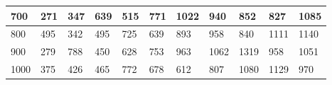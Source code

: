 \documentclass[10pt,letterpaper]{article}
\begin{document}
\begin{center}
\begin{table}
\begin{tabular} { |m{0.5cm}|m{1.3cm}|m{1.3cm}|m{1.3cm}|m{1.3cm}|m{1.3cm}|m{1.3cm}|m{1.3cm}|m{1.3cm}|m{1.3cm}|m{1.3cm}|}
\hline
\cellcolor{Gray}700 & \Large 271 & \Large 347 & \Large 639 & \Large 515 & \Large 771 & \Large 1022 & \Large 940 & \Large 852 & \Large 827 & \Large 1085 \\
\hline
\cellcolor{Gray}800 & \Large 495 & \Large 342 & \Large 495 & \Large 725 & \Large 639 & \Large 893 & \Large 958 & \Large 840 & \Large 1111 & \Large 1140 \\
\hline
\cellcolor{Gray}900 & \Large 279 & \Large 788 & \Large 450 & \Large 628 & \Large 753 & \Large 963 & \Large 1062 & \Large 1319 & \Large 958 & \Large 1051 \\
\hline
\cellcolor{Gray}1000 & \Large 375 & \Large 426 & \Large 465 & \Large 772 & \Large 678 & \Large 612 & \Large 807 & \Large 1080 & \Large 1129 & \Large 970 \\
\hline
\end{tabular} \\
\end{table}
\end{center}
\newpage 
{}
\end{document}

